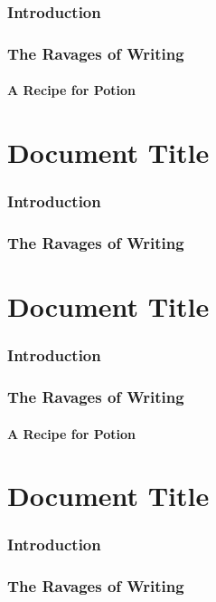 \hypertarget{x-introduction}{\section*{Introduction}}
\tableofcontents
\hypertarget{x-the-ravages-of-writing}{\section*{The Ravages of Writing}}
\hypertarget{x-a-recipe-for-potion}{\subsection*{A Recipe for Potion}}

\hypertarget{x-document-title}{\part*{Document Title}}
\hypertarget{x-introduction}{\section*{Introduction}}

\hypertarget{x-the-ravages-of-writing}{\section*{The Ravages of Writing}}

\hypertarget{x-document-title}{\part*{Document Title}}
\hypertarget{x-introduction}{\section*{Introduction}}

\hypertarget{x-the-ravages-of-writing}{\section*{The Ravages of Writing}}
\hypertarget{x-a-recipe-for-potion}{\subsection*{A Recipe for Potion}}

\hypertarget{x-document-title}{\part*{Document Title}}
\hypertarget{x-introduction}{\section*{Introduction}}

\hypertarget{x-the-ravages-of-writing}{\section*{The Ravages of Writing}}
